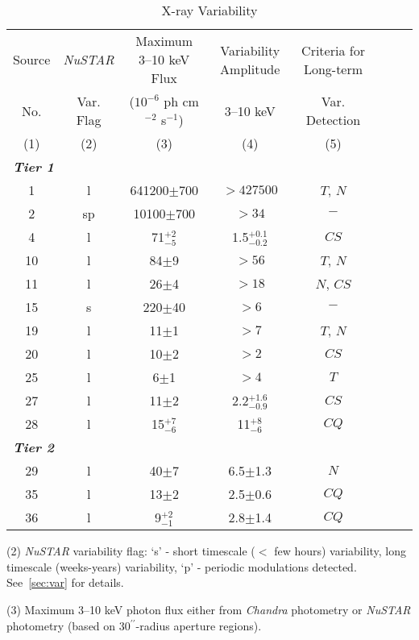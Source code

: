 \documentclass[iop,revtex4]{emulateapj}
\newcommand\T{\rule{0pt}{2.6ex}}       %
\newcommand\B{\rule[-1.2ex]{0pt}{0pt}} %
\newcommand\M{\rule{0pt}{2.3ex}}
\begin{document}
\begin{landscape}
\begin{table}
\begin{minipage}{0.8\linewidth}
\centering
\footnotesize
\begin{threeparttable}
\caption{X-ray Variability}
\begin{tabular}{cccccccc} \hline \hline
\T Source & \textit{NuSTAR} & Maximum 3--10 keV Flux & Variability Amplitude & Criteria for Long-term \\
No. & Var. Flag & ($10^{-6}$ ph cm$^{-2}$ s$^{-1}$) &  3--10 keV & Var. Detection \\
\B (1) & (2) & (3) & (4) & (5) \\
\hline
\multicolumn{2}{l}{\textbf{\textit{Tier 1}}} &&&&&&\T\\
\T 1&l&641200$\pm$700&$>427500$ & $T$, $N$\\
\M 2&sp&10100$\pm$700&$>34$&$-$\\
\M 4&l&71$^{+2}_{-5}$&1.5$^{+0.1}_{-0.2}$&$CS$\\
\M 10&l&84$\pm$9&$>56$&$T$, $N$\\
\M 11&l&26$\pm$4&$>18$&$N$, $CS$\\
\M 15&s&220$\pm$40&$>6$&$-$\\
\M 19&l&11$\pm$1&$>7$&$T$, $N$\\
\M 20&l&10$\pm$2&$>2$&$CS$\\
\M 25&l&6$\pm$1&$>4$&$T$\\
\M 27&l&11$\pm$2&2.2$^{+1.6}_{-0.9}$&$CS$\\
\M\B 28&l&15$^{+7}_{-6}$&11$^{+8}_{-6}$&$CQ$\\
\hline
\multicolumn{2}{l}{\textbf{\textit{Tier 2}}} &&&&&&\T\\
\M 29&l&40$\pm$7&6.5$\pm$1.3&$N$\\
\M 35&l&13$\pm$2&2.5$\pm$0.6&$CQ$\\
\M\B 36&l&9$^{+2}_{-1}$&2.8$\pm$1.4&$CQ$\\
\hline \hline
\end{tabular}
\begin{tablenotes}[flushleft]
\item (2) \textit{NuSTAR} variability flag: `s' - short timescale ($<$ few hours) variability, long timescale (weeks-years) variability, `p' - periodic modulations detected.  See~\ref{sec:var} for details.  
\item (3) Maximum 3--10 keV photon flux either from \textit{Chandra} photometry or \textit{NuSTAR} photometry (based on 30$^{\prime\prime}$-radius aperture regions).

\end{tablenotes}
\end{threeparttable}
\end{minipage}
\end{table}
\end{landscape}
\end{document}
